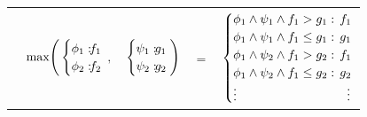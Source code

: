 \documentclass{article} %
\begin{document}
{\footnotesize
\vspace{-2mm}
\begin{center}
\begin{tabular}{r c c c l}
&
\hspace{-7mm} $\mathrm{max} \Bigg(
  \begin{cases}
    \phi_1: \hspace{-2mm} & \hspace{-2mm} f_1 \\ 
    \phi_2: \hspace{-2mm} & \hspace{-2mm} f_2 \\ 
  \end{cases}$
$,$
&
\hspace{-4mm}
  $\begin{cases}
    \psi_1: \hspace{-2mm} & \hspace{-2mm} g_1 \\ 
    \psi_2: \hspace{-2mm} & \hspace{-2mm} g_2 \\ 
  \end{cases} \Bigg)$
&
\hspace{-4mm} 
$ = $
&
\hspace{-4mm}
  $\begin{cases}
  \phi_1 \wedge \psi_1 \wedge f_1 > g_1    : & \hspace{-2mm} f_1 \\ 
  \phi_1 \wedge \psi_1 \wedge f_1 \leq g_1 : & \hspace{-2mm} g_1 \\ 
  \phi_1 \wedge \psi_2 \wedge f_1 > g_2    : & \hspace{-2mm}f_1 \\ 
  \phi_1 \wedge \psi_2 \wedge f_1 \leq g_2 : & \hspace{-2mm} g_2 \\ 
  \vdots & \vdots
  \end{cases}$
\end{tabular}
\end{center}
\vspace{-3mm}
}
\end{document}
